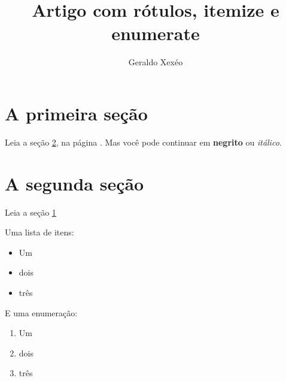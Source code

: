 \documentclass{article}
\title{Artigo com rótulos, itemize e enumerate}
\author{Geraldo Xexéo}
\begin{document}
\maketitle  

\section{A primeira seção}\label{sec:pri}
Leia a seção \ref{sec:seg}, na página \pageref{sec:seg}.
Mas você pode continuar em \textbf{negrito} 
ou \textit{itálico}.

\section{A segunda seção}\label{sec:seg}
Leia a seção \ref{sec:pri}

Uma lista de itens:
\begin{itemize}
    \item Um
    \item dois
    \item três
\end{itemize}

E uma enumeração:
\begin{enumerate}
    \item Um
    \item dois
    \item três
\end{enumerate}
\end{document}
